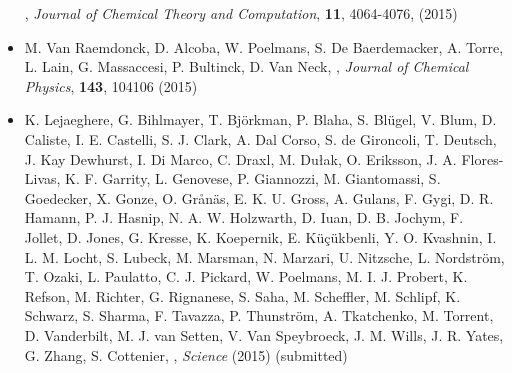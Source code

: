 \begin{itemize}
      ,
      \textit{Journal of Chemical Theory and Computation}, \textbf{11}, 4064-4076, (2015) 
  \item M. Van Raemdonck, D. Alcoba,  W. Poelmans, S. De Baerdemacker, A. Torre, L. Lain, G. Massaccesi, P. Bultinck,  D. Van Neck, 
      ,
      \textit{Journal of Chemical Physics}, \textbf{143}, 104106  (2015)
  \item K. Lejaeghere, G. Bihlmayer, T. Bj\"orkman, P. Blaha, S. Bl\"ugel, V. Blum, D. Caliste, I. E. Castelli, S. J. Clark, A. Dal Corso, S. de
      Gironcoli, T. Deutsch, J. Kay Dewhurst, I. Di Marco, C. Draxl, M. Du{\l}ak, O. Eriksson, J. A. Flores-Livas, K. F. Garrity, L. Genovese, P.
      Giannozzi, M. Giantomassi, S. Goedecker, X. Gonze, O. Gr{\aa}n\"as, E. K. U. Gross, A. Gulans, F. Gygi, D. R. Hamann, P. J. Hasnip, N. A. W.
      Holzwarth, D. Iuan, D. B. Jochym, F. Jollet, D. Jones, G. Kresse, K. Koepernik, E. K\"u\c{c}\"ukbenli, Y. O. Kvashnin, I. L. M. Locht, S.
      Lubeck, M. Marsman, N. Marzari, U. Nitzsche, L. Nordstr\"om, T. Ozaki, L. Paulatto, C. J. Pickard, W. Poelmans, M. I. J. Probert, K. Refson, M.
      Richter, G. Rignanese, S. Saha, M. Scheffler, M. Schlipf, K. Schwarz, S. Sharma, F. Tavazza, P. Thunstr\"om, A. Tkatchenko, M. Torrent, D.
      Vanderbilt, M. J. van Setten, V. Van Speybroeck, J. M. Wills, J. R. Yates, G. Zhang, S. Cottenier,
      ,
      \textit{Science} (2015) (submitted)
\end{itemize}

